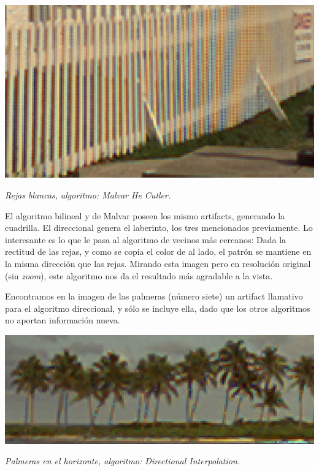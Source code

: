 	\begin{center}
		\includegraphics[scale=.5]{../enunciado/images_files/cualitativo/pharo_rails_malvar.png}
		\vspace{2pt}
		\par
		\footnotesize\textit{Rejas blancas, algoritmo: Malvar He Cutler.}
	\end{center}

\vspace{\baselineskip}
El algoritmo bilineal y de Malvar poseen los mismo artifacts, generando la cuadrilla. El direccional genera el laberinto, los tres mencionados previamente. Lo interesante es lo que le pasa al algoritmo de vecinos más cercanos: Dada la rectitud de las rejas, y como se copia el color de al lado, el patrón se mantiene en la misma dirección que las rejas. Mirando esta imagen pero en resolución original (sin \textit{zoom}), este algoritmo nos da el resultado más agradable a la vista.


\vspace{\baselineskip}

Encontramos en la imagen de las palmeras (número siete) un artifact llamativo para el algoritmo direccional, y sólo se incluye ella, dado que los otros algoritmos no aportan información nueva.

	\begin{center}
		\includegraphics[scale=.5]{../enunciado/images_files/cualitativo/palms_directional.png}
		\vspace{2pt}
		\par
		\footnotesize\textit{Palmeras en el horizonte, algoritmo: Directional Interpolation.}
	\end{center}

